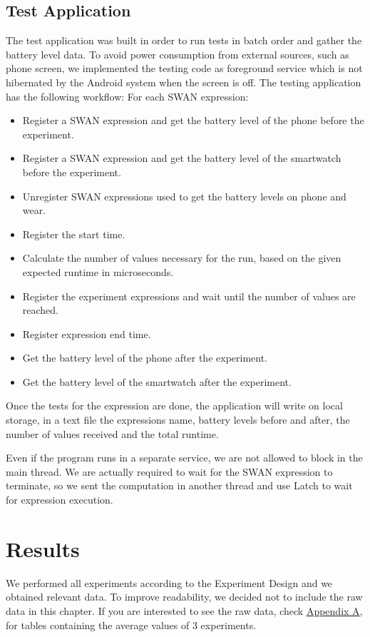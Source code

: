 \subsection{Test Application}
The test application was built in order to run tests in batch order and gather the battery level data. To avoid power consumption from external sources, such as phone screen, we implemented the testing code as foreground service\cite{foreground_service} which is not hibernated by the Android system when the screen is off. 
The testing application has the following workflow:
For each SWAN expression:
\begin{itemize}
 \item Register a SWAN expression and get the battery level of the phone before the experiment.
 \item Register a SWAN expression and get the battery level of the smartwatch before the experiment.
 \item Unregister SWAN expressions used to get the battery levels on phone and wear.
 \item Register the start time.
 \item Calculate the number of values necessary for the run, based on the given expected runtime in microseconds.
 \item Register the experiment expressions and wait until the number of values are reached.
 \item Register expression end time.
 \item Get the battery level of the phone after the experiment.
 \item Get the battery level of the smartwatch after the experiment.
\end{itemize}


Once the tests for the expression are done, the application will write on local storage, in a text file the expressions name,
battery levels before and after, the number of values received and the total runtime.

Even if the program runs in a separate service, we are not allowed to block in the main thread. 
We are actually required to wait for the SWAN expression to terminate, so we sent the computation in another thread and use Latch\cite{latch} to wait for expression execution.

\section{Results}

We performed all experiments according to the Experiment Design and we obtained relevant data. To improve readability,
we decided not to include the raw data in this chapter. If you are interested to see the raw data, check \hyperref[AppendixPower]{Appendix A}, for tables containing the
average values of 3 experiments.

